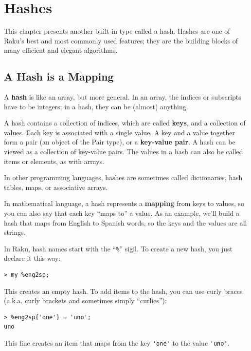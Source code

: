 
\chapter{Hashes}
\label{hashes}

This chapter presents another built-in type called a hash. 
Hashes are one of Raku's best and most commonly used 
features; they are the building blocks of many efficient 
and elegant algorithms.


\section{A Hash is a Mapping}
\label{hash_descr}

A {\bf hash} is like an array, but more general.  In an 
array, the indices or subscripts have to be integers; in a hash, 
they can be (almost) anything.

A hash contains a collection of indices, which are called 
{\bf keys}, and a collection of values.  Each key is associated with a single value.  A key and a value together form a pair 
(an object of the Pair type), or a {\bf key-value pair}. A 
hash can be viewed as a collection of key-value pairs. The 
values in a hash can also be called items or elements, as with arrays.

In other programming languages, hashes are sometimes called 
dictionaries, hash tables, maps, or associative arrays.

In mathematical language, a hash represents a {\bf mapping}
from keys to values, so you can also say that each key
``maps to'' a value. As an example, we'll build a hash that 
maps from English to Spanish words, so the keys and the 
values are all strings.

In Raku, hash names start with the ``\verb"%"'' sigil. To create 
a new hash, you just declare it this way:

\begin{verbatim}
> my %eng2sp;
\end{verbatim}

This creates an empty hash. To add items to the hash, 
you can use curly braces (a.k.a. curly brackets and 
sometimes simply ``curlies''):

\begin{verbatim}
> %eng2sp{'one'} = 'uno';
uno
\end{verbatim}
%
This line creates an item that maps from the key
\verb"'one'" to the value \verb"'uno'".  

